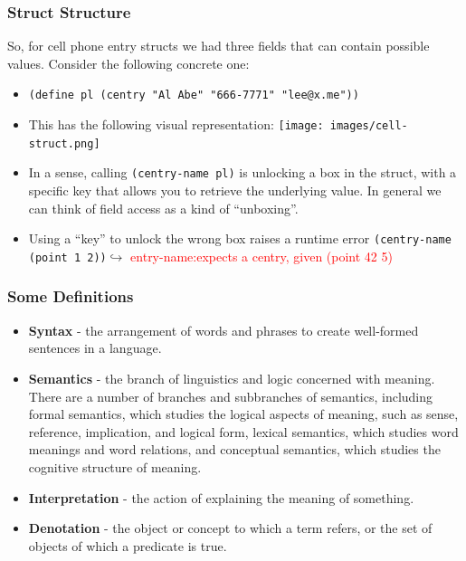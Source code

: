 \documentclass{beamer}
\begin{document}
\begin{frame}
  \frametitle{Struct Structure}
  So, for cell phone entry structs we had three fields that can contain
  possible values. Consider the following concrete one:
  \begin{itemize}
  \item<2->
    \texttt{(define pl (centry "Al Abe" "666-7771" "lee@x.me"))}
  \item<3-> This has the following visual representation:
    \texttt{[image: images/cell-struct.png]}
  \item<4-> In a sense, calling \texttt{(centry-name pl)} is unlocking a box in the struct, with a specific key that
    allows you to retrieve the underlying value. In general we can
    think of field access as a kind of ``unboxing''.
  \item<5-> Using a ``key'' to unlock the wrong box raises a runtime
    error \texttt{(centry-name (point 1 2))}$\hookrightarrow$ \textcolor{red}{entry-name:expects a centry, given (point 42 5)}    
  \end{itemize}
\end{frame}

\begin{frame}
  \frametitle{Some Definitions}
  \begin{itemize}
  \item \textbf{Syntax} - the arrangement of words and phrases to create well-formed sentences in a language.
  \item<2-> \textbf{Semantics} - the branch of linguistics and logic concerned with meaning. There are a number of branches and subbranches of semantics, including formal semantics, which studies the logical aspects of meaning, such as sense, reference, implication, and logical form, lexical semantics, which studies word meanings and word relations, and conceptual semantics, which studies the cognitive structure of meaning.
  \item<3-> \textbf{Interpretation} - the action of explaining the meaning of something.
  \item<4-> \textbf{Denotation} - the object or concept to which a term refers, or the set of objects of which a predicate is true.
  \end{itemize}  
\end{frame}
\end{document}
